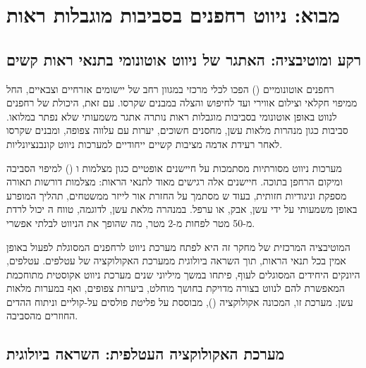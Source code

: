 

\section{מבוא: ניווט רחפנים בסביבות מוגבלות ראות}
\label{sec:ch01_intro}

\subsection{רקע ומוטיבציה: האתגר של ניווט אוטונומי בתנאי ראות קשים}
\label{sec:ch01_motivation}

רחפנים אוטונומיים () הפכו לכלי מרכזי במגוון רחב של יישומים אזרחיים וצבאיים, החל ממיפוי חקלאי וצילום אווירי ועד לחיפוש והצלה במבנים שקרסו. עם זאת, היכולת של רחפנים לנווט באופן אוטונומי בסביבות מוגבלות ראות נותרה אתגר משמעותי שלא נפתר במלואו. סביבות כגון מנהרות מלאות עשן, מחסנים חשוכים, יערות עם עלווה צפופה, ומבנים שקרסו לאחר רעידת אדמה מציבות קשיים ייחודיים למערכות ניווט קונבנציונליות. \cite{Thrun2005ProbRobotics}

מערכות ניווט מסורתיות מסתמכות על חיישנים אופטיים כגון מצלמות ו () למיפוי הסביבה ומיקום הרחפן בתוכה. חיישנים אלה רגישים מאוד לתנאי הראות: מצלמות דורשות תאורה מספקת וניגודיות חזותית, בעוד ש מסתמך על החזרת אור לייזר ממשטחים, תהליך המופרע באופן משמעותי על ידי עשן, אבק, או ערפל. במנהרה מלאת עשן, לדוגמה, טווח ה יכול לרדת מ-50 מטר לפחות מ-2 מטר, מה שהופך את הניווט לבלתי אפשרי. \cite{Thrun2005ProbRobotics}

המוטיבציה המרכזית של מחקר זה היא לפתח מערכת ניווט לרחפנים המסוגלת לפעול באופן אמין בכל תנאי הראות, תוך השראה ביולוגית ממערכת האקולוקציה של עטלפים. עטלפים, היונקים היחידים המסוגלים לעוף, פיתחו במשך מיליוני שנים מערכת ניווט אקוסטית מתוחכמת המאפשרת להם לנווט בצורה מדויקת בחושך מוחלט, ביערות צפופים, ואף במערות מלאות עשן. מערכת זו, המכונה אקולוקציה (), מבוססת על פליטת פולסים על-קוליים וניתוח ההדים החוזרים מהסביבה. \cite{GriffinBatEcholocation} \cite{Simmons1979BatSonar}

\subsection{מערכת האקולוקציה העטלפית: השראה ביולוגית}
\label{sec:ch01_bio_inspiration}

